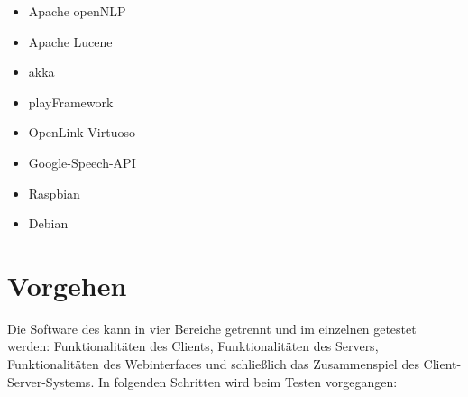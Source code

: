\begin{itemize}
\item Apache openNLP
\item Apache Lucene
\item akka
\item playFramework
\item OpenLink Virtuoso
\item Google-Speech-API
\item Raspbian
\item Debian
\end{itemize}

\section{Vorgehen}

Die Software des \NewsGenies kann in vier Bereiche getrennt und im einzelnen
getestet werden:
Funktionalitäten des Clients, Funktionalitäten des Servers, Funktionalitäten des
Webinterfaces und schließlich das Zusammenspiel des Client-Server-Systems. In
folgenden Schritten wird beim Testen vorgegangen:

